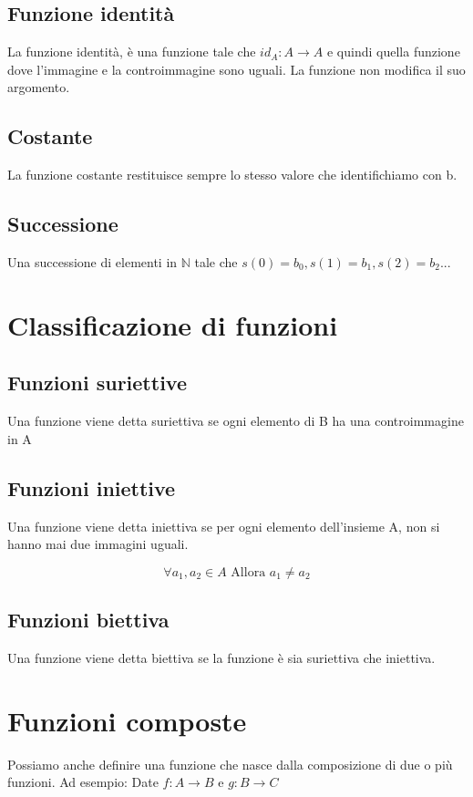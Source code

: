 \documentclass[a4paper, 10pt]{article}
\begin{document}
\subsection{Funzione identità}
La funzione identità, è una funzione tale che $ id_A: A \rightarrow A $ e quindi quella funzione dove l'immagine e la controimmagine sono uguali. La funzione non modifica il suo argomento.

\subsection{Costante}
La funzione costante restituisce sempre lo stesso valore che identifichiamo con b.

\subsection{Successione}
Una successione di elementi in $ \mathbb{N} $ tale che $ s\left(0\right) = b_0, s\left(1\right) = b_1, s\left(2\right) = b_2... $

\section{Classificazione di funzioni}

\subsection{Funzioni suriettive}
Una funzione viene detta suriettiva se ogni elemento di B ha una controimmagine in A

\subsection{Funzioni iniettive}
Una funzione viene detta iniettiva se per ogni elemento dell'insieme A, non si hanno mai due immagini uguali.

$$ \forall a_1,a_2 \in A \text{ Allora } a_1 \neq a_2 $$

\subsection{Funzioni biettiva}
Una funzione viene detta biettiva se la funzione è sia suriettiva che iniettiva.

\section{Funzioni composte}
Possiamo anche definire una funzione che nasce dalla composizione di due o più funzioni. Ad esempio:
Date $ f: A \rightarrow B $ e $ g: B \rightarrow C $
\end{document}
